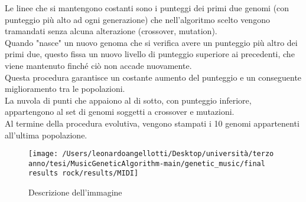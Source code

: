 \documentclass[a4paper,12pt]{report}
\begin{document}
Le linee che si mantengono costanti sono i punteggi dei primi due genomi (con punteggio più alto ad ogni generazione) che nell'algoritmo scelto vengono tramandati senza alcuna alterazione (crossover, mutation). \\
Quando "nasce" un nuovo genoma che si verifica avere un punteggio più altro dei primi due, questo fissa un nuovo livello di punteggio superiore ai precedenti, che viene mantenuto finché ciò non accade nuovamente. \\
Questa procedura garantisce un costante aumento del punteggio e un conseguente miglioramento tra le popolazioni. \\
La nuvola di punti che appaiono al di sotto, con punteggio inferiore, appartengono al set di genomi soggetti a crossover e mutazioni. \\
Al termine della procedura evolutiva, vengono stampati i 10 genomi appartenenti all'ultima popolazione.

\begin{figure}[h!]
    \centering
    \texttt{[image: /Users/leonardoangellotti/Desktop/università/terzo anno/tesi/MusicGeneticAlgorithm-main/genetic\_music/final results rock/results/MIDI]} 
    \caption{Descrizione dell'immagine}
    \label{fig:immagine}
\end{figure}
\end{document}
